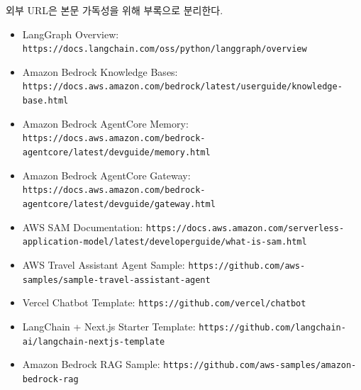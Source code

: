 \documentclass[12pt,a4paper]{article}
\newcommand{\DocNeedspace}[1]{\par\ifdim\dimexpr\pagegoal-\pagetotal\relax<#1\newpage\fi}
\begin{document}
\DocNeedspace{3\baselineskip}
외부 URL은 본문 가독성을 위해 부록으로 분리한다.


\begin{itemize}
\item LangGraph Overview: \texttt{https:\allowbreak{}/\allowbreak{}/\allowbreak{}docs.\allowbreak{}langchain.\allowbreak{}com/\allowbreak{}oss/\allowbreak{}python/\allowbreak{}langgraph/\allowbreak{}overview}
\item Amazon Bedrock Knowledge Bases: \texttt{https:\allowbreak{}/\allowbreak{}/\allowbreak{}docs.\allowbreak{}aws.\allowbreak{}amazon.\allowbreak{}com/\allowbreak{}bedrock/\allowbreak{}latest/\allowbreak{}userguide/\allowbreak{}knowledge-\allowbreak{}base.\allowbreak{}html}
\item Amazon Bedrock AgentCore Memory: \texttt{https:\allowbreak{}/\allowbreak{}/\allowbreak{}docs.\allowbreak{}aws.\allowbreak{}amazon.\allowbreak{}com/\allowbreak{}bedrock-\allowbreak{}agentcore/\allowbreak{}latest/\allowbreak{}devguide/\allowbreak{}memory.\allowbreak{}html}
\item Amazon Bedrock AgentCore Gateway: \texttt{https:\allowbreak{}/\allowbreak{}/\allowbreak{}docs.\allowbreak{}aws.\allowbreak{}amazon.\allowbreak{}com/\allowbreak{}bedrock-\allowbreak{}agentcore/\allowbreak{}latest/\allowbreak{}devguide/\allowbreak{}gateway.\allowbreak{}html}
\item AWS SAM Documentation: \texttt{https:\allowbreak{}/\allowbreak{}/\allowbreak{}docs.\allowbreak{}aws.\allowbreak{}amazon.\allowbreak{}com/\allowbreak{}serverless-\allowbreak{}application-\allowbreak{}model/\allowbreak{}latest/\allowbreak{}developerguide/\allowbreak{}what-\allowbreak{}is-\allowbreak{}sam.\allowbreak{}html}
\item AWS Travel Assistant Agent Sample: \texttt{https:\allowbreak{}/\allowbreak{}/\allowbreak{}github.\allowbreak{}com/\allowbreak{}aws-\allowbreak{}samples/\allowbreak{}sample-\allowbreak{}travel-\allowbreak{}assistant-\allowbreak{}agent}
\item Vercel Chatbot Template: \texttt{https:\allowbreak{}/\allowbreak{}/\allowbreak{}github.\allowbreak{}com/\allowbreak{}vercel/\allowbreak{}chatbot}
\item LangChain + Next.js Starter Template: \texttt{https:\allowbreak{}/\allowbreak{}/\allowbreak{}github.\allowbreak{}com/\allowbreak{}langchain-\allowbreak{}ai/\allowbreak{}langchain-\allowbreak{}nextjs-\allowbreak{}template}
\item Amazon Bedrock RAG Sample: \texttt{https:\allowbreak{}/\allowbreak{}/\allowbreak{}github.\allowbreak{}com/\allowbreak{}aws-\allowbreak{}samples/\allowbreak{}amazon-\allowbreak{}bedrock-\allowbreak{}rag}

\end{itemize}
\end{document}
